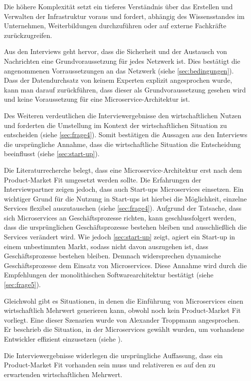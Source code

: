 Die höhere Komplexität setzt ein tieferes Verständnis über das Erstellen und Verwalten der Infrastruktur voraus und fordert, abhängig des Wissensstandes im Unternehmen, Weiterbildungen durchzuführen oder auf externe Fachkräfte zurückzugreifen.

\label{sec:netzwerk}
Aus den Interviews geht hervor, dass die Sicherheit und der Austausch von Nachrichten eine Grundvoraussetzung für jedes Netzwerk ist. Dies bestätigt die angenommenen Vorraussetzungen an das Netzwerk (siehe \cref{sec:bedingungen}). Dass der Datendurchsatz von keinem Experten explizit angesprochen wurde, kann man darauf zurückführen, dass dieser als Grundvoraussetzung gesehen wird und keine Voraussetzung für eine Microservice-Architektur ist.

Des Weiteren verdeutlichen die Interviewergebnisse den wirtschaftlichen Nutzen und forderten die Umstellung im Kontext der wirtschaftlichen Situation zu entscheiden (siehe \cref{sec:frage4}). Somit bestätigen die Aussagen aus den Interviews die ursprüngliche Annahme, dass die wirtschaftliche Situation die Entscheidung beeinflusst (siehe \cref{sec:start-up}).

Die Literaturrecherche belegt, dass eine Microservice-Architektur erst nach dem Product-Market Fit umgesetzt werden sollte. Die Erfahrungen der Interviewpartner zeigen jedoch, dass auch Start-ups Microservices einsetzen. Ein wichtiger Grund für die Nutzung in Start-ups ist hierbei die Möglichkeit, einzelne Services flexibel auszutauschen (siehe \cref{sec:frage4}). Aufgrund der Tatsache, dass sich Microservices an Geschäftsprozesse richten, kann geschlussfolgert werden, dass die ursprünglichen Geschäftsprozesse bestehen bleiben und ausschließlich die Services verändert wird. Wie jedoch \cref{sec:start-up} zeigt, agiert ein Start-up in einem unbestimmten Markt, sodass nicht davon auszugehen ist, dass Geschäftsprozesse bestehen bleiben. Demnach widersprechen dynamische Geschäftsprozesse dem Einsatz von Microservices. Diese Annahme wird durch die Empfehlungen der monolithischen Softwarearchitektur bestätigt (siehe \cref{sec:frage5}).

Gleichwohl gibt es Situationen, in denen die Einführung von Microservices einen wirtschaftlich Mehrwert generieren kann, obwohl noch kein Product-Market Fit vorliegt. Eine dieser Szenarien wurde von Alexander Troppmann angesprochen. Er beschrieb die Situation, in der Microservices gewählt wurden, um vorhandene Entwickler effizient einzusetzen (siehe ).

\label{sec:wirtschaftlich}
Die Interviewergebnisse widerlegen die ursprüngliche Auffassung, dass ein Product-Market Fit vorhanden sein muss und relativeren es auf den zu erwartenden wirtschaftlichen Mehrwert.

